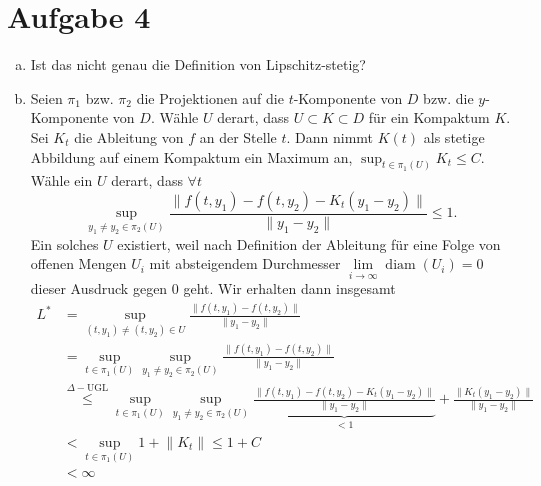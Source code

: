 \documentclass{article}
\begin{document}
    \section*{Aufgabe 4}
    \begin{enumerate}[(a)]
        \item Ist das nicht genau die Definition von Lipschitz-stetig?
        \item Seien $\pi_1$ bzw. $\pi_2$ die Projektionen auf die $t$-Komponente von $D$ bzw. die $y$-Komponente von $D$.
        Wähle $U$ derart, dass $U \subset K \subset D$ für ein Kompaktum $K$. Sei $K_t$ die Ableitung von $f$ an der Stelle $t$. Dann nimmt $K(t)$ als stetige Abbildung auf einem Kompaktum ein Maximum an, $\sup_{t\in \pi_1(U)} K_t \leq C$.
        Wähle ein $U$ derart, dass $\forall t$
        $$\sup_{y_1\neq y_2 \in \pi_2(U)} \frac{\lVert f(t, y_1) - f(t, y_2) - K_t(y_1-y_2)\rVert}{\lVert y_1 - y_2\rVert} \leq 1.$$ Ein solches $U$ existiert, weil nach Definition der Ableitung für eine Folge von offenen Mengen $U_i$ mit absteigendem Durchmesser $\lim\limits_{i \to \infty} \operatorname{diam}(U_i) = 0$ dieser Ausdruck gegen 0 geht.
        Wir erhalten dann insgesamt
        \begin{align*}
            L^* &= \sup_{(t, y_1)\neq (t,y_2) \in U} \frac{\lVert f(t, y_1) - f(t, y_2)\rVert}{\lVert y_1 - y_2\rVert}\\
            &= \sup_{t\in \pi_1(U)} \sup_{y_1\neq y_2 \in \pi_2(U)} \frac{\lVert f(t, y_1) - f(t, y_2)\rVert}{\lVert y_1 - y_2\rVert}\\
            &\overset{\Delta-\text{UGL}}{\leq} \sup_{t\in \pi_1(U)} \sup_{y_1\neq y_2 \in \pi_2(U)} \underbrace{\frac{\lVert f(t, y_1) - f(t, y_2) - K_t(y_1-y_2)\rVert}{\lVert y_1 - y_2\rVert}}_{< 1} + \frac{\lVert K_t (y_1 - y_2)\rVert}{\lVert y_1 - y_2\rVert}\\
            &< \sup_{t\in \pi_1(U)} 1 + \lVert K_t\rVert \leq 1 + C\\
            &< \infty
        \end{align*}
    \end{enumerate}
   
\end{document}
